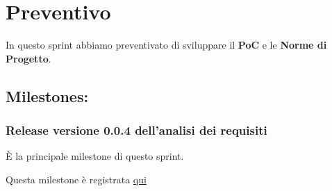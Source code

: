 \section{Preventivo}

In questo sprint abbiamo preventivato di sviluppare il \textbf{PoC} e le \textbf{Norme di Progetto}.

\subsection{Milestones:}  
\subsubsection{Release versione 0.0.4 dell'analisi dei requisiti}

È la principale milestone di questo sprint.

Questa milestone è registrata \href{https://github.com/SWEasabi/analisi-dei-requisiti/milestone/4}{qui}
